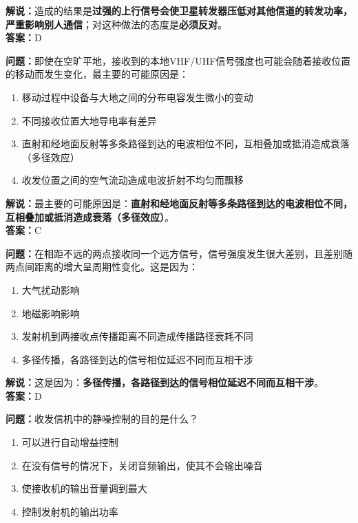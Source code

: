 \documentclass{ctexbook}
\begin{document}
\noindent\textbf{解说：}造成的结果是\textbf{过强的上行信号会使卫星转发器压低对其他信道的转发功率，严重影响别人通信}；对这种做法的态度是\textbf{必须反对}。\\\noindent\textbf{答案：}D%

\bigskip


\noindent\textbf{问题：}即使在空旷平地，接收到的本地VHF/UHF信号强度也可能会随着接收位置的移动而发生变化，最主要的可能原因是：

\begin{enumerate}[label=\Alph*), leftmargin=3em]
	\item 移动过程中设备与大地之间的分布电容发生微小的变动
	\item 不同接收位置大地导电率有差异
	\item 直射和经地面反射等多条路径到达的电波相位不同，互相叠加或抵消造成衰落（多径效应）
	\item 收发位置之间的空气流动造成电波折射不均匀而飘移
\end{enumerate}

\noindent\textbf{解说：}最主要的可能原因是：\textbf{直射和经地面反射等多条路径到达的电波相位不同，互相叠加或抵消造成衰落（多径效应）}。\\\noindent\textbf{答案：}C%



\bigskip


\noindent\textbf{问题：}在相距不远的两点接收同一个远方信号，信号强度发生很大差别，且差别随两点间距离的增大呈周期性变化。这是因为：

\begin{enumerate}[label=\Alph*), leftmargin=3em]
	\item 大气扰动影响
	\item 地磁影响影响
	\item 发射机到两接收点传播距离不同造成传播路径衰耗不同
	\item 多径传播，各路径到达的信号相位延迟不同而互相干涉
\end{enumerate}

\noindent\textbf{解说：}这是因为：\textbf{多径传播，各路径到达的信号相位延迟不同而互相干涉}。\\\noindent\textbf{答案：}D%

\bigskip


\noindent\textbf{问题：}收发信机中的静噪控制的目的是什么？

\begin{enumerate}[label=\Alph*), leftmargin=3em]
	\item 可以进行自动增益控制
	\item 在没有信号的情况下，关闭音频输出，使其不会输出噪音%
	\item 使接收机的输出音量调到最大
	\item 控制发射机的输出功率
\end{enumerate}
\end{document}
